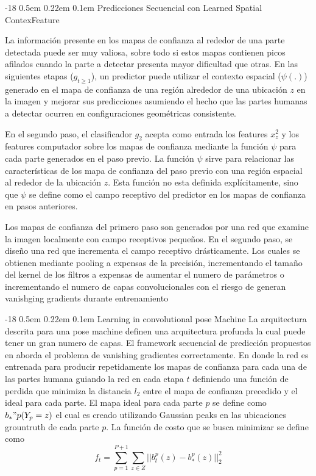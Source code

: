 \documentclass[runningheads]{llncs}
\makeatletter
\renewcommand\subsubsection{\@startsection{subsubsection}{3}{\z@}%
	{-18\p@ \@plus -4\p@ \@minus -4\p@}%
	{0.5em \@plus 0.22em \@minus 0.1em}%
	{\normalfont\normalsize\bfseries\boldmath}}
\makeatother
\begin{document}
\subsubsection{Predicciones Secuencial con Learned Spatial ContexFeature}

La información presente en los mapas de confianza al rededor de una parte detectada puede ser muy valiosa, sobre todo si estos mapas contienen picos afilados cuando la parte a detectar presenta mayor dificultad que otras. En las siguientes etapas ($g_{t\ge1}$), un predictor puede utilizar el contexto espacial ($\psi(.)$) generado en el mapa de confianza de una región alrededor de una ubicación $z$ en la imagen y mejorar sus predicciones asumiendo el hecho que las partes humanas a detectar ocurren en configuraciones geométricas consistente.

En el segundo paso, el clasificador $g_2$ acepta como entrada los features $x_z^2$ y los features computador sobre los mapas de confianza mediante la función $\psi$ para cada parte generados en el paso previo. La función $\psi$ sirve para relacionar las características de los mapa de confianza del paso previo con una región espacial al rededor de la ubicación $z$. Esta función no esta definida explícitamente, sino que $\psi$ se define como el campo receptivo del predictor en los mapas de confianza en pasos anteriores.

Los mapas de confianza del primero paso son generados por una red que examine la imagen localmente con campo receptivos pequeños. En el segundo paso, se diseño una red que incrementa el campo receptivo drásticamente. Los cuales se obtienen mediante pooling a expensas de la precisión, incrementando el tamaño del kernel de los filtros a expensas de aumentar el numero de parámetros o incrementando el numero de capas convolucionales con el riesgo de generan vanishging gradients durante entrenamiento

\subsubsection{Learning in convolutional pose Machine}
La arquitectura descrita para una pose machine definen una arquitectura profunda la cual puede tener un gran numero de capas. El framework secuencial de predicción propuestos en \cite{convposemachine} aborda el problema de vanishing gradientes correctamente. En donde la red es entrenada para producir repetidamente los mapas de confianza para cada una de las partes humana guiando la red en cada etapa $t$ definiendo una función de perdida que minimiza la distancia $l_2$ entre el mapa de confianza precedido y el ideal para cada parte. El mapa ideal para cada parte $p$ se define como $b_*"p(Y_p=z)$ el cual es creado utilizando Gaussian peaks en las ubicaciones grountruth de cada parte $p$.
La función de costo que se busca minimizar se define como
\begin{equation}
f_t = \sum_{p=1}^{P+1}\sum_{z\in Z}||b_t^p(z) - b_*^p(z)||_2^2
\end{equation}
\end{document}
